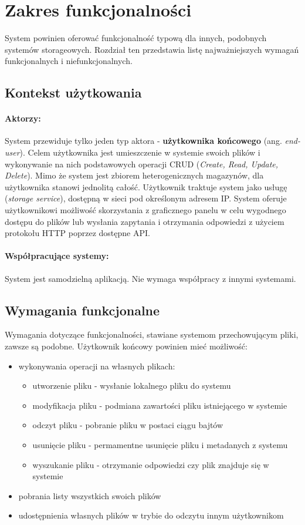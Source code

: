 \section{Zakres funkcjonalności}
\label{sec:zakres-funkcjonalnosci}
System powinien oferować funkcjonalność typową dla innych, podobnych systemów storageowych. Rozdział ten przedstawia listę najważniejszych wymagań funkcjonalnych i niefunkcjonalnych.

\subsection{Kontekst użytkowania}

\paragraph{Aktorzy:} System przewiduje tylko jeden typ aktora - \textbf{użytkownika końcowego} (ang. \textit{end-user}). Celem użytkownika jest umieszczenie w systemie swoich plików i wykonywanie na nich podstawowych operacji CRUD (\textit{Create, Read, Update, Delete}). Mimo że system jest zbiorem heterogenicznych magazynów, dla użytkownika stanowi jednolitą całość. Użytkownik traktuje system jako usługę (\textit{storage service}), dostępną w sieci pod określonym adresem IP. System oferuje użytkownikowi możliwość skorzystania z graficznego panelu w celu wygodnego dostępu do plików lub wysłania zapytania i otrzymania odpowiedzi z użyciem protokołu HTTP poprzez dostępne API.

\paragraph{Współpracujące systemy:} System jest samodzielną aplikacją. Nie wymaga współpracy z innymi systemami.

\subsection{Wymagania funkcjonalne}
Wymagania dotyczące funkcjonalności, stawiane systemom przechowującym pliki, zawsze są podobne. Użytkownik końcowy powinien mieć możliwość:
\begin{itemize}
	\item wykonywania operacji na własnych plikach:
	\begin{itemize}
		\item utworzenie pliku - wysłanie lokalnego pliku do systemu
		\item modyfikacja pliku - podmiana zawartości pliku istniejącego w systemie
		\item odczyt pliku - pobranie pliku w postaci ciągu bajtów
		\item usunięcie pliku - permamentne usunięcie pliku i metadanych z systemu
		\item wyszukanie pliku - otrzymanie odpowiedzi czy plik znajduje się w systemie
	\end{itemize}
	\item pobrania listy wszystkich swoich plików
	\item udostępnienia własnych plików w trybie do odczytu innym użytkownikom
\end{itemize}

